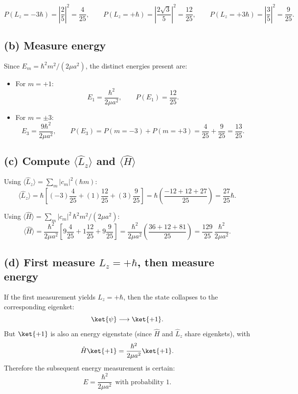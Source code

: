 \documentclass{article}
\begin{document}
\[
P(L_z=-3\hbar)=\left|\frac{2}{5}\right|^2=\frac{4}{25},
\qquad
P(L_z=+\hbar)=\left|\frac{2\sqrt3}{5}\right|^2=\frac{12}{25},
\qquad
P(L_z=+3\hbar)=\left|\frac{3}{5}\right|^2=\frac{9}{25}.
\]

\subsection*{(b) Measure energy}

Since $E_m=\hbar^2 m^2/(2\mu a^2)$, the distinct energies present are:

\begin{itemize}
\item For $m=+1$:
\[
E_1=\frac{\hbar^2}{2\mu a^2},
\qquad
P(E_1)=\frac{12}{25}.
\]
\item For $m=\pm 3$:
\[
E_3=\frac{9\hbar^2}{2\mu a^2},
\qquad
P(E_3)=P(m=-3)+P(m=+3)=\frac{4}{25}+\frac{9}{25}=\frac{13}{25}.
\]
\end{itemize}

\subsection*{(c) Compute $\langle \hat L_z\rangle$ and $\langle \hat H\rangle$}

Using $\langle \hat L_z\rangle=\sum_m |c_m|^2(\hbar m)$:
\[
\langle \hat L_z\rangle
=\hbar\left[(-3)\frac{4}{25}+(1)\frac{12}{25}+(3)\frac{9}{25}\right]
=\hbar\left(\frac{-12+12+27}{25}\right)
=
\boxed{\frac{27}{25}\hbar}.
\]

Using $\langle \hat H\rangle=\sum_m |c_m|^2\,\hbar^2 m^2/(2\mu a^2)$:
\[
\langle \hat H\rangle
=\frac{\hbar^2}{2\mu a^2}\left[9\frac{4}{25}+1\frac{12}{25}+9\frac{9}{25}\right]
=\frac{\hbar^2}{2\mu a^2}\left(\frac{36+12+81}{25}\right)
=
\boxed{\frac{129}{25}\,\frac{\hbar^2}{2\mu a^2}}.
\]

\subsection*{(d) First measure $L_z=+\hbar$, then measure energy}

If the first measurement yields $L_z=+\hbar$, then the state collapses to the corresponding
eigenket:
\[
\ket{\psi}\longrightarrow \ket{+1}.
\]
But $\ket{+1}$ is also an energy eigenstate (since $\hat H$ and $\hat L_z$ share eigenkets),
with
\[
\hat H\ket{+1}=\frac{\hbar^2}{2\mu a^2}\ket{+1}.
\]
Therefore the subsequent energy measurement is certain:
\[
\boxed{
E=\frac{\hbar^2}{2\mu a^2}\ \ \text{with probability }1.
}
\]
\end{document}
